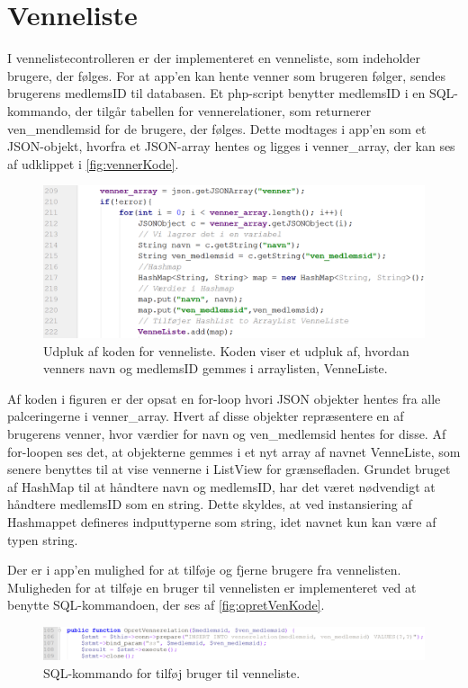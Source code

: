 \section{Venneliste}
I vennelistecontrolleren er der implementeret en venneliste, som indeholder brugere, der følges. For at app'en kan hente venner som brugeren følger, sendes brugerens medlemsID til databasen. Et php-script benytter medlemsID i en SQL-kommando, der tilgår tabellen for vennerelationer, som returnerer ven_mendlemsid for de brugere, der følges. 
Dette modtages i app'en som et JSON-objekt, hvorfra et JSON-array hentes og ligges i venner_array, der kan ses af udklippet i  \autoref{fig:vennerKode}.  

\begin{figure} [H]
\centering
\includegraphics[width=1\textwidth]{figures/imple/vennerKode}
\caption{Udpluk af koden for venneliste. Koden viser et udpluk af, hvordan venners navn og medlemsID gemmes i arraylisten, VenneListe.}
\label{fig:vennerKode}
\end{figure} 

Af koden i figuren er der opsat en for-loop hvori JSON objekter hentes fra alle palceringerne i venner_array. Hvert af disse objekter repræsentere en af brugerens venner, hvor værdier for navn og ven_medlemsid hentes for disse. 
Af for-loopen ses det, at objekterne gemmes i et nyt array af navnet VenneListe, som senere benyttes til at vise vennerne i ListView for grænsefladen. Grundet bruget af HashMap til at håndtere navn og medlemsID, har det været nødvendigt at håndtere medlemsID som en string. Dette skyldes, at ved instansiering af Hashmappet defineres indputtyperne som string, idet navnet kun kan være af typen string. 

Der er i app'en mulighed for at tilføje og fjerne brugere fra vennelisten. Muligheden for at tilføje en bruger til vennelisten er implementeret ved at benytte SQL-kommandoen, der ses af \autoref{fig:opretVenKode}.

\begin{figure} [H]
\centering
\includegraphics[width=1\textwidth]{figures/imple/opretVenKode}
\caption{SQL-kommando for tilføj bruger til venneliste.}
\label{fig:opretVenKode}
\end{figure}

